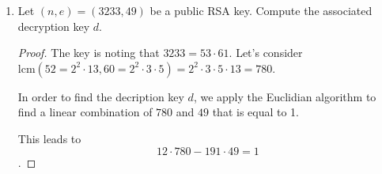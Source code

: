 \documentclass[12pt]{article}
\begin{document}
\begin{enumerate}
\begin{proof}
        Likewise $\textrm{lcm}(a_1, \ldots, a_k) = \displaystyle\prod \limits_{j=1}^{m} p_i^{max_{i}{a_{i,j}}}$.
        
        Notice that since each $a_i | b_i$, then for each $i$, $a_{i,j} \leq b_{i,j}$. Therefore $max_i{a_{i,j}}\leq max_i{b_{i,j}}$.
        
        Therefore $\textrm{lcm}(a_1, \ldots, a_k) \; | \; \textrm{lcm}(b_1, \ldots, b_k)$
        
        Now consider $m = p_1^{m_1} \ldots p_k^{m_k}$ and $n = p_1^{n_1}\ldots p_k^{n_k}$
        
        Since $m \;|\; n$ it follows that each $m_i \leq n_i$.
        
        Recall that $\lambda\left ( \prod\limits_{i=1}^{k} p_i^{e_i} \right) = \textrm{lcm} (\lambda(p_1^{e_1}),\ldots, \lambda(p_k^{e_k}))$
        
        Therefore $\lambda(m) = \textrm{lcm}(\lambda(p_1^{m_1}),\ldots, \lambda(p_k^{m_k}))$ and $\lambda(n) = \textrm{lcm}(\lambda(p_1^{n_1}),\ldots, \lambda(p_k^{n_k}))$
        
         Also recall that $$\lambda (1) = 1; \lambda(2) = 1; \lambda(4) = 2$$  $$ \lambda (2^e) = 2^{e-2} \textrm{ for } e \geq 3$$  $$ \lambda(p^e)= p^{e-1}(p-1) \textrm{ for } p \in \mathbb P; p \neq 2$$
        
        Also since each $m_i \leq n_i$, then it follows that $\lambda(p_i^{m_i}) \; | \; \lambda(p_i^{n_i})$.
        
        Applying the proof of the hint yields that 
        $$ \lambda(m) = \textrm{lcm}(\lambda(p_1^{m_1}),\ldots, \lambda(p_k^{m_k})) \; | \; \lambda(n) = \textrm{lcm}(\lambda(p_1^{n_1}),\ldots, \lambda(p_k^{n_k})) $$
    \end{proof}
    
    \item Let $(n,e) =(3233,49)$ be a public RSA key. Compute the associated decryption key $d$.
    
    \begin{proof}
    The key is noting that $3233 = 53 \cdot 61$. Let's consider $\textrm{lcm}(52 = 2^2 \cdot 13, 60 = 2^2\cdot 3 \cdot 5) = 2^2 \cdot 3 \cdot 5 \cdot 13 = 780$.
    
    In order to find the decription key $d$, we apply the Euclidian algorithm to find a linear combination of $780 $ and $49$ that is equal to 1. 
    
    This leads to $$ 12 \cdot 780 -191 \cdot 49 = 1$$.
    

\end{proof}
\end{enumerate}
\end{document}
